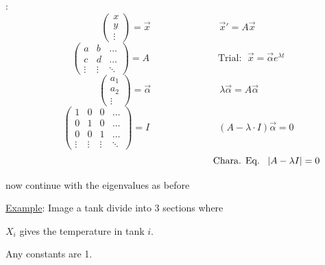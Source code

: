 \documentclass[12pt]{article}
\numberwithin{equation}{subsection}
\newcommand{\absp}[1]{\left\vert #1 \right\vert}
\newcommand{\indd}{\hspace{2cm}}
\newcommand{\indf}{\hspace{3cm}}
\newcommand{\indm}{\hspace{6.5cm}}
\newcommand{\exa}{\noindent \underline{Example}: \hspace{1cm}}
\begin{document}
:
\begin{equation}
\begin{pmatrix}
x \\
y \\
\vdots
\end{pmatrix}=\vec{x} \indf \vec{x}'=A\vec{x}
\end{equation}
\begin{equation}
\begin{pmatrix}
a & b & \dots \\
c & d & \dots \\
\vdots & \vdots & \ddots
\end{pmatrix}=A \indf \textrm{Trial}: \ \  \vec{x}=\vec{\alpha}e^{\lambda t}
\end{equation}
\begin{equation}
\begin{pmatrix}
a_1 \\
a_2 \\
\vdots
\end{pmatrix}=\vec{\alpha} \indf \lambda\vec{\alpha}=A\vec{\alpha}
\end{equation}
\begin{equation}
\begin{pmatrix}
1 & 0 & 0 & \dots \\
0 & 1 & 0 & \dots \\
0 & 0 & 1 & \dots \\
\vdots & \vdots & \vdots & \ddots
\end{pmatrix}=I \indf (A-\lambda \cdot I)\vec{\alpha}=0
\end{equation}
\begin{equation}
\indm \textrm{Chara. Eq.} \ \ \absp{A-\lambda I}=0
\end{equation}
\begin{center}
now continue with the eigenvalues as before
\end{center}

\exa Image a tank divide into 3 sections where 

\indd $X_i$ gives the temperature in tank $i$. 

\indd Any constants are 1.
\end{document}
